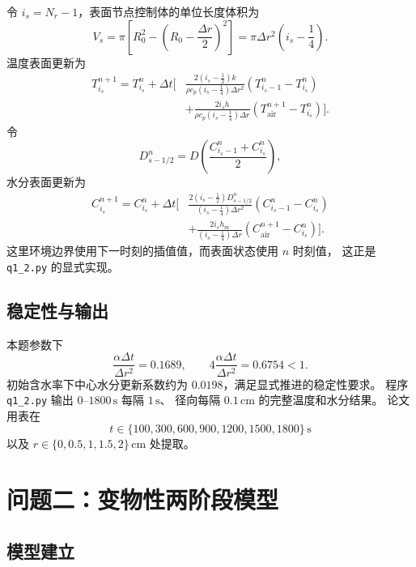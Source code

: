 \documentclass[UTF8,a4paper,11pt]{ctexart}
\numberwithin{equation}{section}
\begin{document}
令 \(i_s=N_r-1\)，表面节点控制体的单位长度体积为
\begin{equation}
V_s=\pi\left[R_0^2-\left(R_0-\frac{\Delta r}{2}\right)^2\right]
=\pi\Delta r^2\left(i_s-\frac14\right).
\label{eq:q1-Vs}
\end{equation}
温度表面更新为
\begin{equation}
\begin{aligned}
T_{i_s}^{n+1}=T_{i_s}^n+\Delta t\bigg[&
\frac{2(i_s-\frac12)k}
{\rho c_p(i_s-\frac14)\Delta r^2}
(T_{i_s-1}^n-T_{i_s}^n)\\
&+\frac{2i_sh}{\rho c_p(i_s-\frac14)\Delta r}
(T_{\mathrm{air}}^{n+1}-T_{i_s}^n)\bigg].
\end{aligned}
\label{eq:q1-T-surface}
\end{equation}
令
\[
D_{s-1/2}^n=D\left(\frac{C_{i_s-1}^n+C_{i_s}^n}{2}\right),
\]
水分表面更新为
\begin{equation}
\begin{aligned}
C_{i_s}^{n+1}=C_{i_s}^n+\Delta t\bigg[&
\frac{2(i_s-\frac12)D_{s-1/2}^n}
{(i_s-\frac14)\Delta r^2}
(C_{i_s-1}^n-C_{i_s}^n)\\
&+\frac{2i_sh_m}{(i_s-\frac14)\Delta r}
(C_{\mathrm{air}}^{n+1}-C_{i_s}^n)\bigg].
\end{aligned}
\label{eq:q1-C-surface}
\end{equation}
这里环境边界使用下一时刻的插值值，而表面状态使用 \(n\) 时刻值，
这正是 \texttt{q1\_2.py} 的显式实现。

\subsection{稳定性与输出}

本题参数下
\[
\frac{\alpha\Delta t}{\Delta r^2}=0.1689,\qquad
4\frac{\alpha\Delta t}{\Delta r^2}=0.6754<1.
\]
初始含水率下中心水分更新系数约为 \(0.0198\)，满足显式推进的稳定性要求。
程序 \texttt{q1\_2.py} 输出 \(0\)--\(1800\,\mathrm{s}\) 每隔 \(1\,\mathrm{s}\)、
径向每隔 \(0.1\,\mathrm{cm}\) 的完整温度和水分结果。
论文用表在
\[
t\in\{100,300,600,900,1200,1500,1800\}\,\mathrm{s}
\]
以及 \(r\in\{0,0.5,1,1.5,2\}\,\mathrm{cm}\) 处提取。

\section{问题二：变物性两阶段模型}

\subsection{模型建立}
\end{document}

